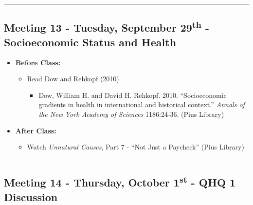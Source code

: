 \documentclass[
]{book}
\providecommand{\tightlist}{%
  \setlength{\itemsep}{0pt}\setlength{\parskip}{0pt}}
\begin{document}
\begin{center}\rule{0.5\linewidth}{0.5pt}\end{center}

\hypertarget{meeting-13---tuesday-september-29th---socioeconomic-status-and-health}{%
\subsection*{\texorpdfstring{Meeting 13 - Tuesday, September 29\textsuperscript{th} - Socioeconomic Status and Health}{Meeting 13 - Tuesday, September 29th - Socioeconomic Status and Health}}\label{meeting-13---tuesday-september-29th---socioeconomic-status-and-health}}

\begin{itemize}
\tightlist
\item
  \textbf{Before Class:}

  \begin{itemize}
  \tightlist
  \item
    Read Dow and Rehkopf (2010)

    \begin{itemize}
    \tightlist
    \item
      Dow, William H. and David H. Rehkopf. 2010. ``Socioeconomic gradients in health in international and historical context.'' \emph{Annals of the New York Academy of Sciences} 1186:24-36. (Pius Library)
    \end{itemize}
  \end{itemize}
\item
  \textbf{After Class:}

  \begin{itemize}
  \tightlist
  \item
    Watch \emph{Unnatural Causes}, Part 7 - ``Not Just a Paycheck'' (Pius Library)
  \end{itemize}
\end{itemize}

\begin{center}\rule{0.5\linewidth}{0.5pt}\end{center}

\hypertarget{meeting-14---thursday-october-1st---qhq-1-discussion}{%
\subsection*{\texorpdfstring{Meeting 14 - Thursday, October 1\textsuperscript{st} - QHQ 1 Discussion}{Meeting 14 - Thursday, October 1st - QHQ 1 Discussion}}\label{meeting-14---thursday-october-1st---qhq-1-discussion}}
\end{document}

